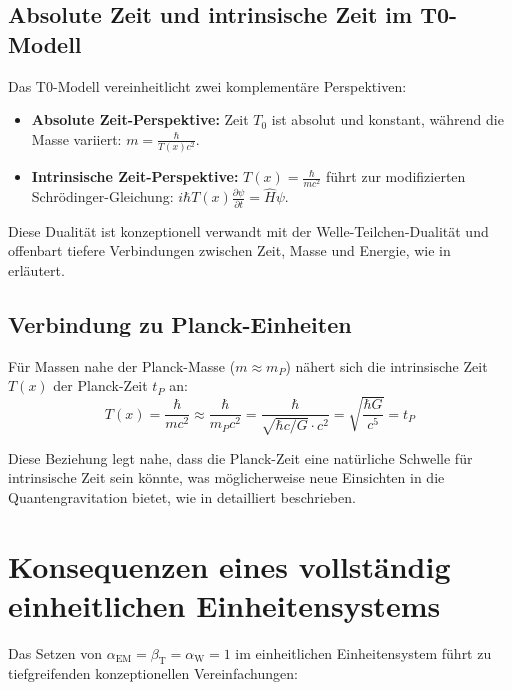\documentclass[12pt,a4paper]{article}
\newcommand{\Tfield}{T(x)}
\newcommand{\betaT}{\beta_{\text{T}}}
\newcommand{\alphaEM}{\alpha_{\text{EM}}}
\newcommand{\alphaW}{\alpha_{\text{W}}}
\newcommand{\Tzero}{T_0}
\begin{document}
	\subsection{Absolute Zeit und intrinsische Zeit im T0-Modell}
	\label{subsec:absolute_intrinsic}
	
	Das T0-Modell vereinheitlicht zwei komplementäre Perspektiven:
	\begin{itemize}
		\item \textbf{Absolute Zeit-Perspektive:} Zeit \(\Tzero\) ist absolut und konstant, während die Masse variiert: \(m = \frac{\hbar}{\Tfield c^2}\).
		\item \textbf{Intrinsische Zeit-Perspektive:} \(\Tfield = \frac{\hbar}{m c^2}\) führt zur modifizierten Schrödinger-Gleichung: \(i\hbar \Tfield \frac{\partial \psi}{\partial t} = \hat{H} \psi\).
	\end{itemize}
	
	Diese Dualität ist konzeptionell verwandt mit der Welle-Teilchen-Dualität und offenbart tiefere Verbindungen zwischen Zeit, Masse und Energie, wie in \cite{pascher_zeit_2025} erläutert.
	
	\subsection{Verbindung zu Planck-Einheiten}
	\label{subsec:planck_connection}
	
	Für Massen nahe der Planck-Masse (\(m \approx m_P\)) nähert sich die intrinsische Zeit \(\Tfield\) der Planck-Zeit \(t_P\) an:
	\begin{equation}
		\Tfield = \frac{\hbar}{m c^2} \approx \frac{\hbar}{m_P c^2} = \frac{\hbar}{\sqrt{\hbar c/G} \cdot c^2} = \sqrt{\frac{\hbar G}{c^5}} = t_P
	\end{equation}
	
	Diese Beziehung legt nahe, dass die Planck-Zeit eine natürliche Schwelle für intrinsische Zeit sein könnte, was möglicherweise neue Einsichten in die Quantengravitation bietet, wie in \cite{pascher_planck_2025} detailliert beschrieben.
	
	\section{Konsequenzen eines vollständig einheitlichen Einheitensystems}
	\label{sec:fully_unified}
	
	Das Setzen von \(\alphaEM = \betaT = \alphaW = 1\) im einheitlichen Einheitensystem führt zu tiefgreifenden konzeptionellen Vereinfachungen:
	
\end{document}

